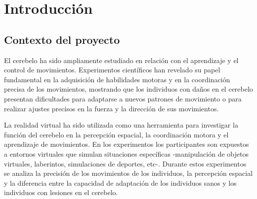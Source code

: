 \documentclass[a4paper,11pt, oneside]{book}
\begin{document}


%

%
%
%
%
%
%
%
%
%
%
%
%
%
%
%
%
%
%
%
%
%
%
\tableofcontents

\chapter{Introducción}

\section{Contexto del proyecto}

El cerebelo ha sido ampliamente estudiado en relación con el aprendizaje y el control de movimientos. Experimentos científicos han revelado su papel fundamental en la adquisición de habilidades motoras y en la coordinación precisa de los movimientos, mostrando que los individuos con daños en el cerebelo presentan dificultades para adaptarse a nuevos patrones de movimiento o para realizar ajustes precisos en la fuerza y la dirección de sus movimientos.

La realidad virtual ha sido utilizada como una herramienta para investigar la función del cerebelo en la percepción espacial, la coordinación motora y el aprendizaje de movimientos. En los experimentos los participantes son expuestos a entornos virtuales que simulan situaciones específicas -manipulación de objetos virtuales, laberintos, simulaciones de deportes, etc-. Durante estos experimentos se analiza la precisión de los movimientos de los individuos, la percepción espacial y la diferencia entre la capacidad de adaptación de los individuos sanos y los individuos con lesiones en el cerebelo.
\end{document}
